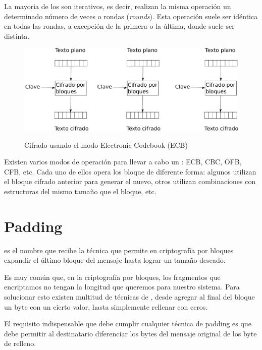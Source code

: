  La mayoria de los  son iterativos, es decir, realizan la misma operación un determinado número de veces o rondas (\emph{rounds}).
 Esta operación suele ser idéntica en todas las rondas, a excepción de la primera o la última, donde suele ser distinta.

 \begin{figure}[ht]
   \centering
   \includegraphics[scale=0.4]{Figures/ECB}
   \decoRule
   \caption[Electronic Codebook (ECB)]{Cifrado usando el modo Electronic Codebook (ECB)} \emph{\parencite{Reference22}}
   \label{fig:ECB}
 \end{figure}

 Existen varios modos de operación para llevar a cabo un : ECB, CBC, OFB, CFB, etc.
 Cada uno de ellos opera los bloque de diferente forma: algunos utilizan el bloque cifrado anterior para generar el nuevo,
 otros utilizan combinaciones con estructuras del mismo tamaño que el bloque, etc. \emph{\parencite{Reference21}}


 \section{Padding}

  es el nombre que recibe la técnica que permite en criptografía por bloques expandir el último bloque del mensaje hasta lograr un tamaño deseado.

 Es muy común que, en la criptografía por bloques, los fragmentos que encriptamos no tengan la longitud que queremos para nuestro sistema.
 Para solucionar esto existen multitud de técnicas de , desde agregar al final del bloque un byte con un cierto valor, hasta simplemente rellenar con ceros.

 El requisito indispensable que debe cumplir cualquier técnica de padding es que debe permitir al destinatario diferenciar los bytes del mensaje original de los byte de relleno. \emph{\parencite{Reference8}}

